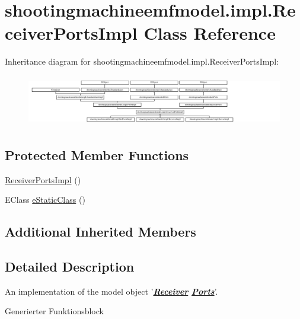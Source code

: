 \hypertarget{classshootingmachineemfmodel_1_1impl_1_1_receiver_ports_impl}{\section{shootingmachineemfmodel.\-impl.\-Receiver\-Ports\-Impl Class Reference}
\label{classshootingmachineemfmodel_1_1impl_1_1_receiver_ports_impl}
}
Inheritance diagram for shootingmachineemfmodel.\-impl.\-Receiver\-Ports\-Impl\-:\begin{figure}[H]
\begin{center}
\leavevmode
\includegraphics[height=2.247492cm]{classshootingmachineemfmodel_1_1impl_1_1_receiver_ports_impl}
\end{center}
\end{figure}
\subsection*{Protected Member Functions}
\begin{DoxyCompactItemize}
\item 
\hyperlink{classshootingmachineemfmodel_1_1impl_1_1_receiver_ports_impl_a9d2661ad5c4848008564bf184ff2c7fd}{Receiver\-Ports\-Impl} ()
\item 
E\-Class \hyperlink{classshootingmachineemfmodel_1_1impl_1_1_receiver_ports_impl_ae51964d59b06809c54279ac488c05c50}{e\-Static\-Class} ()
\end{DoxyCompactItemize}
\subsection*{Additional Inherited Members}


\subsection{Detailed Description}
An implementation of the model object '{\itshape {\bfseries \hyperlink{interfaceshootingmachineemfmodel_1_1_receiver}{Receiver} \hyperlink{interfaceshootingmachineemfmodel_1_1_ports}{Ports}}}'.

Generierter Funktionsblock 

